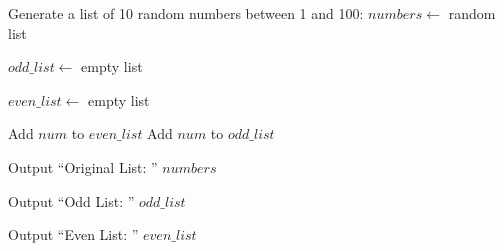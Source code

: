 \begin{algorithm}
\caption{Separate Odd and Even Numbers from a List}
\begin{algorithmic}[1]

\STATE Generate a list of 10 random numbers between 1 and 100:
\STATE $numbers \gets$ random list

\STATE $odd\_list \gets$ empty list

\STATE $even\_list \gets$ empty list


        \STATE Add $num$ to $even\_list$
    \ELSE
        \STATE Add $num$ to $odd\_list$
    \ENDIF

\ENDFOR

\STATE Output ``Original List: '' $numbers$

\STATE Output ``Odd List: '' $odd\_list$

\STATE Output ``Even List: '' $even\_list$

\end{algorithmic}
\end{algorithm}